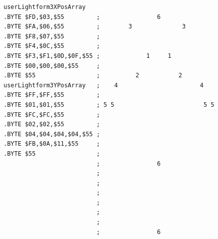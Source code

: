 \begin{minipage}[b]{0.48\linewidth}
\begin{lrbox}{\mybox}%
\begin{lstlisting}[basicstyle=\ttfamily\tiny,escapechar=\%]
userLightform3XPosArray
.BYTE $FD,$03,$55         ;                6               
.BYTE $FA,$06,$55         ;        3              3        
.BYTE $F8,$07,$55         ;                                
.BYTE $F4,$0C,$55         ;                                
.BYTE $F3,$F1,$0D,$0F,$55 ;             1     1            
.BYTE $00,$00,$00,$55     ;                                
.BYTE $55                 ;          2           2         
userLightform3YPosArray   ;    4                       4   
.BYTE $FF,$FF,$55         ;                                
.BYTE $01,$01,$55         ; 5 5                         5 5
.BYTE $FC,$FC,$55         ;                                
.BYTE $02,$02,$55         ;                                
.BYTE $04,$04,$04,$04,$55 ;                                
.BYTE $FB,$0A,$11,$55     ;                                
.BYTE $55                 ;                                
                          ;                6               
                          ;                                
                          ;                                
                          ;                                
                          ;                                
                          ;                                
                          ;                                
                          ;                6               
\end{lstlisting}
\end{lrbox}%
\scalebox{0.8}{\usebox{\mybox}}

\end{minipage}
%
%
